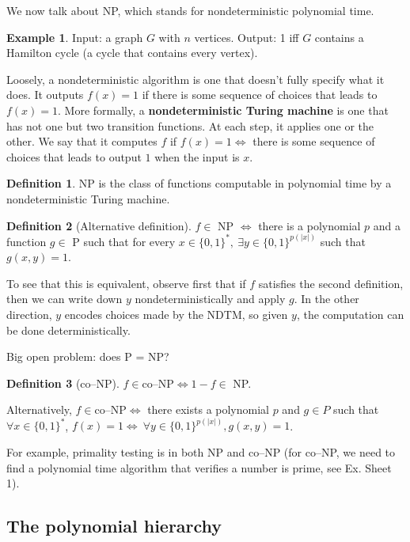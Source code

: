 \documentclass{article}
\theoremstyle{definition}
\newtheorem{example}{Example}[section]
\newtheorem{defn}{Definition}[section]
\begin{document}
We now talk about NP, which stands for nondeterministic polynomial time.
\begin{example}
    Input: a graph $G$ with $n$ vertices. Output: 1 iff $G$ contains a Hamilton cycle (a cycle that contains every vertex).
\end{example}
Loosely, a nondeterministic algorithm is one that doesn't fully specify what it does. It outputs $f(x)=1$ if there is some sequence of choices that leads to $f(x)=1$. More formally, a \textbf{nondeterministic Turing machine} is one that has not one but two transition functions. At each step, it applies one or the other. We say that it computes $f$ if $f(x)=1 \iff$ there is some sequence of choices that leads to output $1$ when the input is $x$.
\begin{defn}
    NP is the class of functions computable in polynomial time by a nondeterministic Turing machine.
\end{defn}
\begin{defn}[Alternative definition]
    $f \in $ NP $\iff$ there is a polynomial $p$ and a function $g \in$ P such that for every $x \in \{0,1\}^{*},~ \exists y \in \{0,1\}^{p(|x|)}$ such that $g(x,y)=1$.
\end{defn}
To see that this is equivalent, observe first that if $f$ satisfies the second definition, then we can write down $y$ nondeterministically and apply $g$. In the other direction, $y$ encodes choices made by the NDTM, so given $y$, the computation can be done deterministically.
\vspace{1mm}
 
Big open problem: does P = NP?

\begin{defn}[co--NP]
    $f \in \text{co--NP} \iff 1-f \in$ NP.
    \vspace{1mm}
     
    Alternatively, $f \in \text{co--NP} \iff$ there exists a polynomial $p$ and $g \in P$ such that $\forall x \in \{0,1\}^*$, $f(x)=1 \iff ~\forall y \in \{0,1\}^{p(|x|)}, g(x,y)=1$.
\end{defn}
For example, primality testing is in both NP and co--NP (for co--NP, we need to find a polynomial time algorithm that verifies a number is prime, see Ex. Sheet 1).
\vspace{1mm}
 
\subsection{The polynomial hierarchy}
\end{document}
